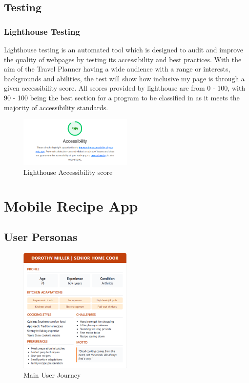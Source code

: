 \documentclass[]{project_final}
\begin{document}
\newpage
\subsection{Testing}
\subsubsection{Lighthouse Testing}
Lighthouse testing is an automated tool which is designed to audit and improve the quality of webpages by testing its accessibility and best practices. With the aim of the Travel Planner having a wide audience with a range or interests, backgrounds and abilities, the test will show how inclusive my page is through a given accessibility score.
All scores provided by lighthouse are from 0 - 100, with 90 - 100 being the best section for a program to be classified in as it meets the majority of accessibility standards.

\begin{figure}[ht!]
    \centering
    \includegraphics[width=0.5\textwidth]{lighthouse.png}
    \vspace*{0.0cm}
    \caption{Lighthouse Accessibility score}
    \label{fig:1}
\end{figure}

\newpage


\section{Mobile Recipe App}
\subsection{User Personas}
\begin{figure}[ht!]
    \centering
    \includegraphics[width=0.5\textwidth]{elderly.png}
    \vspace*{0.0cm}
    \caption{Main User Journey}
    \label{fig:1}
\end{figure}
\end{document}
